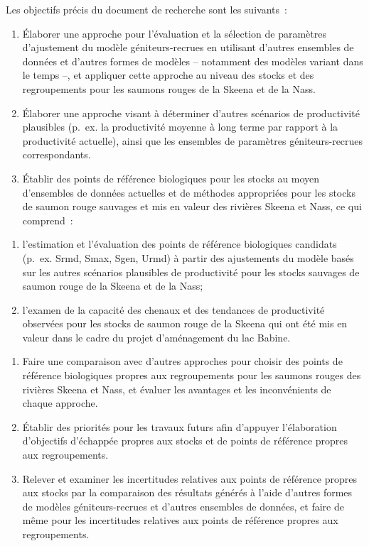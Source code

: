 \documentclass[french,11pt]{book}
\begin{document}
Les objectifs précis du document de recherche sont les suivants~:
\begin{enumerate}
\def\labelenumi{\arabic{enumi}.}

\item
  Élaborer une approche pour l'évaluation et la sélection de paramètres d'ajustement du modèle géniteurs-recrues en utilisant d'autres ensembles de données et d'autres formes de modèles -- notamment des modèles variant dans le temps --, et appliquer cette approche au niveau des stocks et des regroupements pour les saumons rouges de la Skeena et de la Nass.
\item
  Élaborer une approche visant à déterminer d'autres scénarios de productivité plausibles (p.~ex. la productivité moyenne à long terme par rapport à la productivité actuelle), ainsi que les ensembles de paramètres géniteurs-recrues correspondants.
\item
  Établir des points de référence biologiques pour les stocks au moyen d'ensembles de données actuelles et de méthodes appropriées pour les stocks de saumon rouge sauvages et mis en valeur des rivières Skeena et Nass, ce qui comprend~:
\end{enumerate}
\begin{enumerate}
\def\labelenumi{\alph{enumi}.}

\item
  l'estimation et l'évaluation des points de référence biologiques candidats (p.~ex. Srmd, Smax, Sgen, Urmd) à partir des ajustements du modèle basés sur les autres scénarios plausibles de productivité pour les stocks sauvages de saumon rouge de la Skeena et de la Nass;
\item
  l'examen de la capacité des chenaux et des tendances de productivité observées pour les stocks de saumon rouge de la Skeena qui ont été mis en valeur dans le cadre du projet d'aménagement du lac Babine.
\end{enumerate}
\begin{enumerate}
\def\labelenumi{\arabic{enumi}.}
\setcounter{enumi}{3}

\item
  Faire une comparaison avec d'autres approches pour choisir des points de référence biologiques propres aux regroupements pour les saumons rouges des rivières Skeena et Nass, et évaluer les avantages et les inconvénients de chaque approche.
\item
  Établir des priorités pour les travaux futurs afin d'appuyer l'élaboration d'objectifs d'échappée propres aux stocks et de points de référence propres aux regroupements.
\item
  Relever et examiner les incertitudes relatives aux points de référence propres aux stocks par la comparaison des résultats générés à l'aide d'autres formes de modèles géniteurs-recrues et d'autres ensembles de données, et faire de même pour les incertitudes relatives aux points de référence propres aux regroupements.
\end{enumerate}
\end{document}
